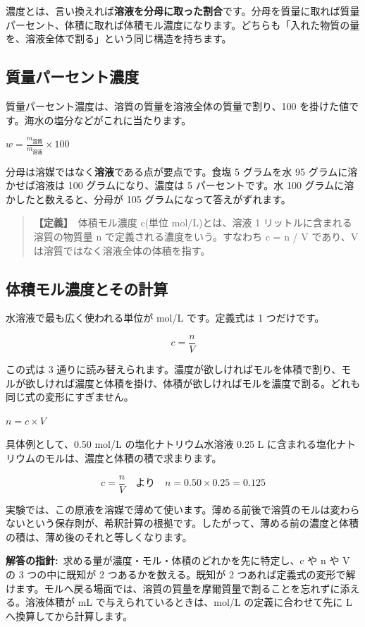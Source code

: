 \documentclass{article}
\begin{document}
濃度とは、言い換えれば\textbf{溶液を分母に取った割合}です。分母を質量に取れば質量パーセント、体積に取れば体積モル濃度になります。どちらも「入れた物質の量を、溶液全体で割る」という同じ構造を持ちます。

\subsection{質量パーセント濃度}

質量パーセント濃度は、溶質の質量を溶液全体の質量で割り、100 を掛けた値です。海水の塩分などがこれに当たります。

\( w = \frac{m_{\text{溶質}}}{m_{\text{溶液}}} \times 100 \)

分母は溶媒ではなく\textbf{溶液}である点が要点です。食塩 5 グラムを水 95 グラムに溶かせば溶液は 100 グラムになり、濃度は 5 パーセントです。水 100 グラムに溶かしたと数えると、分母が 105 グラムになって答えがずれます。

\begin{quote}
\textbf{【定義】}\ 体積モル濃度 c(単位 mol/L)とは、溶液 1 リットルに含まれる溶質の物質量 n で定義される濃度をいう。すなわち c = n / V であり、V は溶質ではなく溶液全体の体積を指す。
\end{quote}

\subsection{体積モル濃度とその計算}

水溶液で最も広く使われる単位が mol/L です。定義式は 1 つだけです。

\[ c = \frac{n}{V} \]

この式は 3 通りに読み替えられます。濃度が欲しければモルを体積で割り、モルが欲しければ濃度と体積を掛け、体積が欲しければモルを濃度で割る。どれも同じ式の変形にすぎません。

\( n = c \times V \)

具体例として、0.50 mol/L の塩化ナトリウム水溶液 0.25 L に含まれる塩化ナトリウムのモルは、濃度と体積の積で求まります。

\[ c = \frac{n}{V} \quad \text{より} \quad n = 0.50 \times 0.25 = 0.125 \]

実験では、この原液を溶媒で薄めて使います。薄める前後で溶質のモルは変わらないという保存則が、希釈計算の根拠です。したがって、薄める前の濃度と体積の積は、薄め後のそれと等しくなります。

\textbf{解答の指針:}\ 求める量が濃度・モル・体積のどれかを先に特定し、c や n や V の 3 つの中に既知が 2 つあるかを数える。既知が 2 つあれば定義式の変形で解けます。モルへ戻る場面では、溶質の質量を摩爾質量で割ることを忘れずに添える。溶液体積が mL で与えられているときは、mol/L の定義に合わせて先に L へ換算してから計算します。
\end{document}
